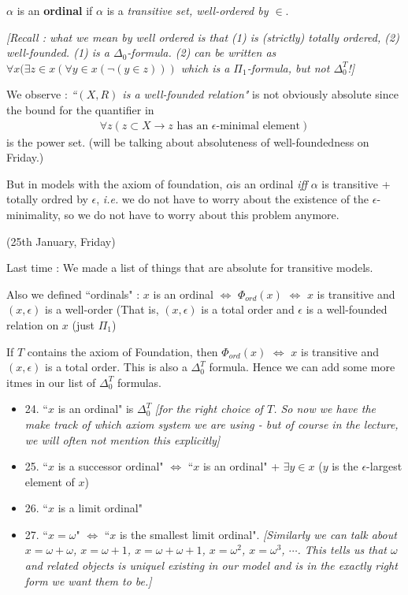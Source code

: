 \documentclass[12pt,a4paper]{article}
\newenvironment{subproof}
{\begin{changemargin}{0.5cm}{0.5cm} 
	}%
	{\end{changemargin}
}
\renewenvironment{i}
{\begin{itemize} 
	}%
	{\end{itemize}
}
\begin{document}
$\alpha$ is an \textbf{ordinal} if $\alpha$ is a \emph{transitive set, well-ordered by $\in$}.
\begin{subproof}
\emph{[Recall : what we mean by well ordered is that (1) is (strictly) totally ordered, (2) well-founded. (1) is a $\Delta_0$-formula. (2) can be written as $\forall x (\exists z\in x(\forall y\in x(\neg(y\in z)))$ which is a $\Pi_1$-formula, but not $\Delta_0^T$!]}

\quad We observe : \emph{``$(X,R)$ is a well-founded relation"} is not obviously absolute since the bound for the quantifier in
\begin{align*}
\forall z (z\subset X \rightarrow z \text{ has an }\epsilon\text{-minimal element})
\end{align*}
is the power set. (will be talking about absoluteness of well-foundedness on Friday.)

\quad But in models with the axiom of foundation, $\alpha $is an ordinal \emph{iff} $\alpha$ is transitive + totally ordred by $\epsilon$, \textit{i.e.} we do not have to worry about the existence of the $\epsilon$-minimality, so we do not have to worry about this problem anymore.
\end{subproof}
\s

\newday

(25th January, Friday)
\s

Last time : We made a list of things that are absolute for transitive models.

\quad Also we defined ``ordinals" : $x$ is an ordinal $\Leftrightarrow$ $\Phi_{ord}(x)$ $\Leftrightarrow$ $x$ is transitive and $(x, \epsilon)$ is a well-order (That is, $(x, \epsilon)$ is a total order and $\epsilon$ is a well-founded relation on $x$ (just $\Pi_1$)

\quad If $T$ contains the axiom of Foundation, then $\Phi_{ord}(x)$ $\Leftrightarrow$ $x$ is transitive and $(x,\epsilon)$ is a total order. This is also a $\Delta_0^T$ formula. Hence we can add some more itmes in our list of $\Delta_0^T$ formulas.

\begin{i}
\item[24.] ``$x$ is an ordinal" is $\Delta_0^T$ \emph{[for the right choice of $T$. So now we have the make track of which axiom system we are using - but of course in the lecture, we will often not mention this explicitly]}
\item[25.] ``$x$ is a successor ordinal" $\Leftrightarrow$ ``$x$ is an ordinal" + $\exists y\in x$ ($y$ is the $\epsilon$-largest element of $x$)
\item[26.] ``$x$ is a limit ordinal"
\item[27.] ``$x=\omega$" $\Leftrightarrow$ ``$x$ is the smallest limit ordinal". \emph{[Similarly we can talk about $x=\omega + \omega$, $x= \omega +1$, $x= \omega+\omega+1$, $x= \omega^2$, $x= \omega^3$, $\cdots$. This tells us that $\omega$ and related objects is uniquel existing in our model and is in the exactly right form we want them to be.]}
\end{i}
\s
\end{document}
